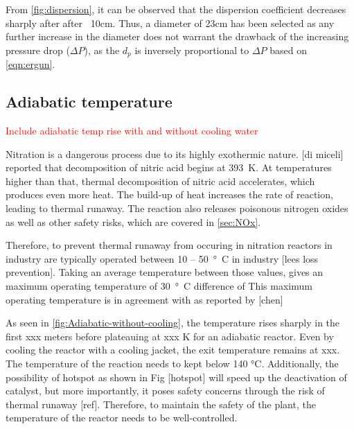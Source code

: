 From \cref{fig:dispersion}, it can be observed that the dispersion coefficient decreases sharply after after ~10cm. Thus, a diameter of 23cm has been selected as any further increase in the diameter does not warrant the drawback of the increasing pressure drop ($\Delta P$), as the $d_p$ is inversely proportional to $\Delta P$ based on \cref{eqn:ergun}.


\subsection{Adiabatic temperature}

\textcolor{red}{Include adiabatic temp rise with and without cooling water}

Nitration is a dangerous process due to its highly exothermic nature. [di miceli] reported that decomposition of nitric acid begins at \SI{393}{\K}.
At temperatures higher than that, thermal decomposition of nitric acid accelerates, which produces even more heat. The build-up of heat increases the rate of reaction, leading to thermal runaway. The reaction also releases poisonous nitrogen oxides as well as other safety risks, which are covered in \cref{sec:NOx}. 

Therefore, to prevent thermal runaway from occuring in nitration reactors in industry are typically operated between \si{10} – \SI{50}{°C} in industry [lees loss prevention]. Taking an average temperature between those values, gives an maximum operating temperature of \SI{30}{°C} difference of This maximum operating temperature is in agreement with as reported by [chen]

As seen in \cref{fig:Adiabatic-without-cooling}, the temperature rises sharply in the first xxx meters before plateauing at xxx K for an adiabatic reactor. Even by cooling the reactor with a cooling jacket, the exit temperature remains at xxx. The temperature of the reaction needs to kept below 140 °C.  Additionally, the possibility of hotspot as shown in Fig [hotspot] will speed up the deactivation of catalyst, but more importantly, it poses safety concerns through the risk of thermal runaway [ref]. Therefore, to maintain the safety of the plant, the temperature of the reactor needs to be well-controlled.

